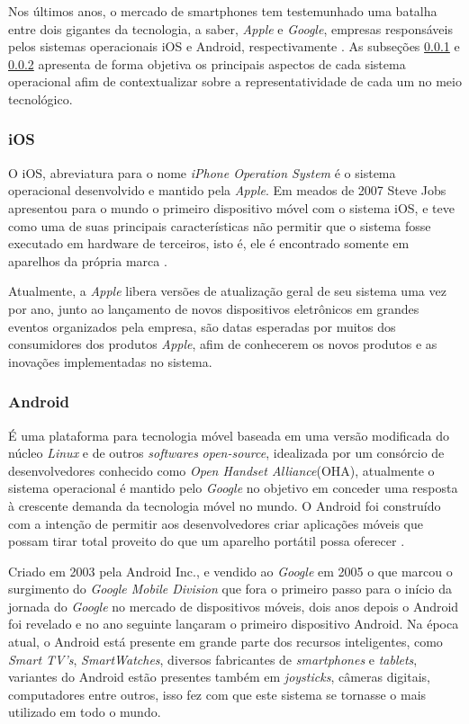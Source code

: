       Nos últimos anos, o mercado de smartphones tem testemunhado uma batalha entre dois gigantes da tecnologia, a saber, \textit{Apple} e \textit{Google}, empresas responsáveis pelos sistemas operacionais iOS e Android, respectivamente \cite{Cezar2018}. As subseções \ref{iOS} e \ref{Android} apresenta de forma objetiva os principais aspectos de cada sistema operacional afim de contextualizar sobre a representatividade de cada um no meio tecnológico.
      
      \subsubsection{iOS}
       \label{iOS}
       
       O iOS, abreviatura para o nome \textit{iPhone Operation System} é o sistema operacional desenvolvido e mantido pela \textit{Apple}. Em meados de 2007 Steve Jobs apresentou para o mundo o primeiro dispositivo móvel com o sistema iOS, e teve como uma de suas principais características não permitir que o sistema fosse executado em hardware de terceiros, isto é, ele é encontrado somente em aparelhos da própria marca \cite{SARTORELI2018}.
       
       Atualmente, a \textit{Apple} libera versões de atualização geral de seu sistema uma vez por ano, junto ao lançamento de novos dispositivos eletrônicos em grandes eventos organizados pela empresa, são datas esperadas por muitos dos consumidores dos produtos \textit{Apple}, afim de conhecerem os novos produtos e as inovações implementadas no sistema.
      
      \subsubsection{Android}
       \label{Android}
      
      É uma plataforma para tecnologia móvel baseada em uma versão modificada do núcleo \textit{Linux} e de outros \textit{softwares} \textit{open-source}, idealizada por um consórcio de desenvolvedores conhecido como \textit{Open Handset Alliance}(OHA), atualmente o sistema operacional é mantido pelo \textit{Google} no objetivo em conceder uma resposta à crescente demanda da tecnologia móvel no mundo. O Android foi construído com a intenção de permitir aos desenvolvedores criar aplicações móveis que possam tirar total proveito do que um aparelho portátil possa oferecer \cite{pereiraandroid}.
      
      Criado em 2003 pela Android Inc., e vendido ao \textit{Google} em 2005 o que marcou o surgimento do \textit{Google Mobile Division} que fora o primeiro passo para o início da jornada do \textit{Google} no mercado de dispositivos móveis, dois anos depois o Android foi revelado e no ano seguinte lançaram o primeiro dispositivo Android. Na época atual, o Android está presente em grande parte dos recursos inteligentes, como \textit{Smart TV's}, \textit{SmartWatches}, diversos fabricantes de \textit{smartphones} e \textit{tablets}, variantes do Android estão presentes também em \textit{joysticks}, câmeras digitais, computadores entre outros, isso fez com que este sistema se tornasse o mais utilizado em todo o mundo.
      

